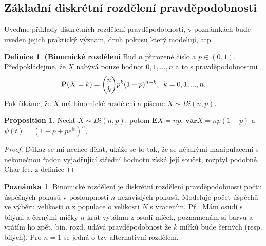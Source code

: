 \documentclass[a4]{report}
\theoremstyle{definition}
\newtheorem{definition}{Definice}[section]
\newtheorem{remark}{Poznámka}[section]
\newtheorem{proposition}{Proposition}[section]
\begin{document}
{%
\subsection{Základní diskrétní rozdělení pravděpodobnosti}
Uveďme příklady diskrétních rozdělení pravděpodobnosti, v poznámkách bude uveden jejich praktický význam, druh pokusu který modelují, atp.
\begin{definition}{\textbf{(Binomické rozdělení}}
Buď $n$ přirozené číslo a $p \in (0, 1)$. Předpokládejme, že $X$ nabývá pouze hodnot $0, 1, ..., n$ a to s pravděpodobnostmi
\begin{equation}
\textbf{P}(X = k) = \binom{n}{k}p^{k}(1-p)^{n-k}, \enskip k = 0, 1, ..., n.
\end{equation}
Pak říkáme, že $X$ má binomické rozdělení a píšeme $X \sim Bi(n,p)$.
\end{definition}
\begin{proposition}
Nechť  $X \sim Bi(n,p)$. potom $\mathbf{E}X = np$, $\mathbf{var}X = np(1-p)$ a $\psi(t) = (1-p + pe^{it})^{n}$.
\end{proposition}
\begin{proof}
Důkaz se mi nechce dělat, ukáže se to tak, že se nějakými manipulacemi s nekonečnou řadou vyjadřující střední hodnotu získá její součet, rozptyl podobně. Char fce. z definice
\end{proof}

\begin{remark}
Binomické rozdělení je diskrétní rozdělení pravděpodobnosti počtu úspěšných pokusů v posloupnosti $n$ nezávislých pokusů.
Modeluje počet úspěchů ve výběru velikosti $n$ z populace o velikosti $N$ s vracením. Př.: Mám osudí s bílými a černými míčky $n$-krát vytáhnu z osudí míček, poznamenám si barvu a vrátím ho zpět, bin. rozd. udává pravděpodobnost že $k$ míčků bude černých (resp. bílých). Pro $n = 1$ se jedná o tzv alternativní rozdělení.
\end{remark}

}
\end{document}
